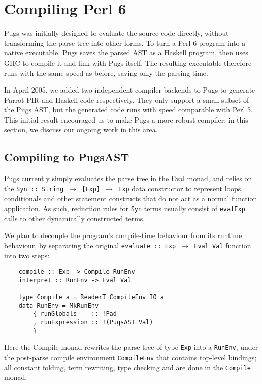 \documentclass[]{sigplanconf}
\newcommand{\code}[1]{\texttt{#1}}
\begin{document}
\section{Compiling Perl 6}
\label{sec:CompilingPerl6}

Pugs was initially designed to evaluate the source code directly, without
transforming the parse tree into other forms.  To turn a Perl 6 program into
a native executable, Pugs saves the parsed AST as a Haskell program, then uses
GHC to compile it and link with Pugs itself.  The resulting executable 
therefore runs with the same speed as before, saving only the parsing time.

In April 2005, we added two independent compiler backends to Pugs to generate
Parrot PIR and Haskell code respectively.  They only support a small subset of
the Pugs AST, but the generated code runs with speed comparable with Perl 5.  
This initial result encouraged us to make Pugs a more robust compiler; in this
section, we discuss our ongoing work in this area.

\subsection{Compiling to PugsAST}
\label{sec:CompilingToPugsAST}

Pugs currently simply evaluates the parse tree in the Eval monad, and relies on
the \code{Syn :: String $\to$ [Exp] $\to$ Exp} data constructor to represent loops,
conditionals and other statement constructs that do not act as a normal
function application.  As such, reduction rules for \code{Syn} terms usually
consist of \code{evalExp} calls to other dynamically constructed terms.

We plan to decouple the program's compile-time behaviour from its runtime
behaviour, by separating the original \code{evaluate :: Exp $\to$ Eval Val}
function into two steps:

\begin{lstlisting}
    compile :: Exp -> Compile RunEnv
    interpret :: RunEnv -> Eval Val

    type Compile a = ReaderT CompileEnv IO a
    data RunEnv = MkRunEnv
        { runGlobals    :: !Pad
        , runExpression :: !(PugsAST Val)
        }
\end{lstlisting}

Here the Compile monad rewrites the parse tree of type \code{Exp} into a
\code{RunEnv}, under the post-parse compile environment \code{CompileEnv} that
contains top-level bindings; all constant folding, term rewriting, type
checking and are done in the \code{Compile} monad.
\end{document}
